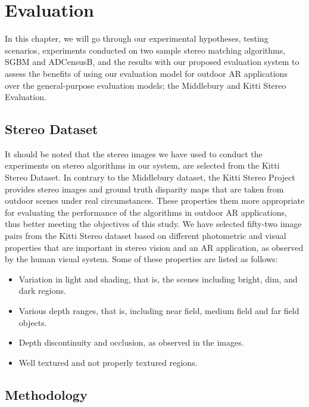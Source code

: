 \chapter{Evaluation}
\label{chap:Evaluation}
\renewcommand{\arraystretch}{0.5}

In this chapter, we will go through our experimental hypotheses, testing scenarios, experiments conducted on two sample 
stereo matching algorithms, SGBM and ADCensusB, and the results with our
proposed evaluation system to assess the benefits of using our evaluation model for outdoor AR applications over the general-purpose evaluation models; 
the Middlebury and Kitti Stereo Evaluation.

\section{Stereo Dataset}
It should be noted that the stereo images we have used to conduct the experiments on stereo algorithms in our system,
are selected from the Kitti Stereo Dataset.
In contrary to the Middlebury dataset, the Kitti Stereo Project provides stereo images and ground truth disparity maps
that are taken from outdoor scenes under real circumstances. These properties them more appropriate 
for evaluating the performance of the algorithms in outdoor AR applications, thus better meeting the objectives of this study.
We have selected fifty-two image pairs from the Kitti Stereo dataset based on different photometric and visual properties that are important
in stereo vision and an AR application, as observed by the human visual system. Some 
of these properties are listed as follows:
\begin{itemize}
\item Variation in light and shading, that is, the scenes including bright, dim, and dark regions.
\item Various depth ranges, that is, including near field, medium field and far field objects. 
\item Depth discontinuity and occlusion, as observed in the images.
\item Well textured and not properly textured regions.
\end{itemize}

\section{Methodology}

